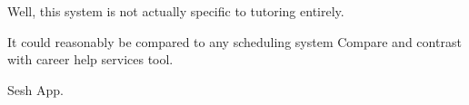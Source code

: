 Well, this system is not actually specific to tutoring entirely.

It could reasonably be compared to any scheduling system Compare and
contrast with career help services tool.

Sesh App.

